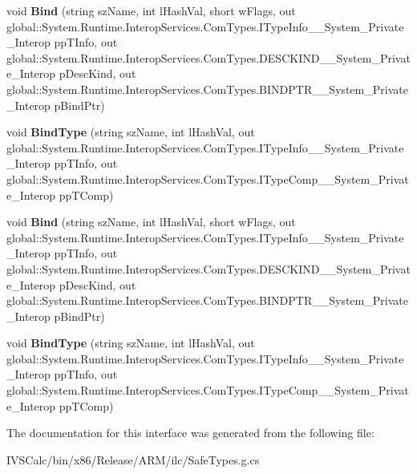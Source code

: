 \begin{DoxyCompactItemize}
void {\bfseries Bind} (string sz\+Name, int l\+Hash\+Val, short w\+Flags, out global\+::\+System.\+Runtime.\+Interop\+Services.\+Com\+Types.\+I\+Type\+Info\+\_\+\+\_\+\+System\+\_\+\+Private\+\_\+\+Interop pp\+T\+Info, out global\+::\+System.\+Runtime.\+Interop\+Services.\+Com\+Types.\+D\+E\+S\+C\+K\+I\+N\+D\+\_\+\+\_\+\+System\+\_\+\+Private\+\_\+\+Interop p\+Desc\+Kind, out global\+::\+System.\+Runtime.\+Interop\+Services.\+Com\+Types.\+B\+I\+N\+D\+P\+T\+R\+\_\+\+\_\+\+System\+\_\+\+Private\+\_\+\+Interop p\+Bind\+Ptr)
\item 
\mbox{\label{interface_system_1_1_runtime_1_1_interop_services_1_1_com_types_1_1_i_type_comp_____system___private___interop_ae21c9bf57bcae58539d1325a4f854d27}} 
void {\bfseries Bind\+Type} (string sz\+Name, int l\+Hash\+Val, out global\+::\+System.\+Runtime.\+Interop\+Services.\+Com\+Types.\+I\+Type\+Info\+\_\+\+\_\+\+System\+\_\+\+Private\+\_\+\+Interop pp\+T\+Info, out global\+::\+System.\+Runtime.\+Interop\+Services.\+Com\+Types.\+I\+Type\+Comp\+\_\+\+\_\+\+System\+\_\+\+Private\+\_\+\+Interop pp\+T\+Comp)
\item 
\mbox{\label{interface_system_1_1_runtime_1_1_interop_services_1_1_com_types_1_1_i_type_comp_____system___private___interop_a18710cd4245d22d84924e20843c1a5b4}} 
void {\bfseries Bind} (string sz\+Name, int l\+Hash\+Val, short w\+Flags, out global\+::\+System.\+Runtime.\+Interop\+Services.\+Com\+Types.\+I\+Type\+Info\+\_\+\+\_\+\+System\+\_\+\+Private\+\_\+\+Interop pp\+T\+Info, out global\+::\+System.\+Runtime.\+Interop\+Services.\+Com\+Types.\+D\+E\+S\+C\+K\+I\+N\+D\+\_\+\+\_\+\+System\+\_\+\+Private\+\_\+\+Interop p\+Desc\+Kind, out global\+::\+System.\+Runtime.\+Interop\+Services.\+Com\+Types.\+B\+I\+N\+D\+P\+T\+R\+\_\+\+\_\+\+System\+\_\+\+Private\+\_\+\+Interop p\+Bind\+Ptr)
\item 
\mbox{\label{interface_system_1_1_runtime_1_1_interop_services_1_1_com_types_1_1_i_type_comp_____system___private___interop_ae21c9bf57bcae58539d1325a4f854d27}} 
void {\bfseries Bind\+Type} (string sz\+Name, int l\+Hash\+Val, out global\+::\+System.\+Runtime.\+Interop\+Services.\+Com\+Types.\+I\+Type\+Info\+\_\+\+\_\+\+System\+\_\+\+Private\+\_\+\+Interop pp\+T\+Info, out global\+::\+System.\+Runtime.\+Interop\+Services.\+Com\+Types.\+I\+Type\+Comp\+\_\+\+\_\+\+System\+\_\+\+Private\+\_\+\+Interop pp\+T\+Comp)
\end{DoxyCompactItemize}


The documentation for this interface was generated from the following file\+:\begin{DoxyCompactItemize}
\item 
I\+V\+S\+Calc/bin/x86/\+Release/\+A\+R\+M/ilc/Safe\+Types.\+g.\+cs\end{DoxyCompactItemize}
